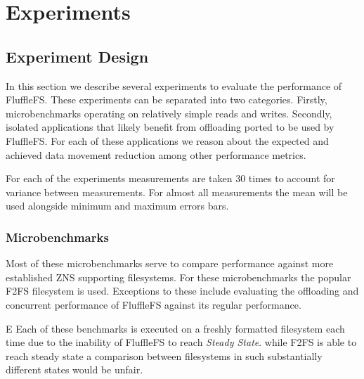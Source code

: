 
\chapter{Experiments} %



\ifpdf
    \graphicspath{{7/figures/PNG/}{7/figures/PDF/}{7/figures/}}
\else
    \graphicspath{{7/figures/EPS/}{7/figures/}}
\fi


% 

\section{Experiment Design}

In this section we describe several experiments to evaluate the performance of
FluffleFS. These experiments can be separated into two categories. Firstly,
microbenchmarks operating on relatively simple reads and writes.
Secondly, isolated applications that likely benefit from offloading
ported to be used by FluffleFS. For each of these applications we reason
about the expected and achieved data movement reduction among other performance
metrics.

For each of the experiments measurements are taken 30 times to account for
variance between measurements. For almost all measurements the mean will
be used alongside minimum and maximum errors bars.

\subsection{Microbenchmarks}

Most of these microbenchmarks serve to compare performance against more
established ZNS supporting filesystems. For these microbenchmarks the popular
F2FS\cite{Lee2015F2FSAN} filesystem is used. Exceptions to these include
evaluating the offloading and concurrent performance of FluffleFS against its
regular performance.

E
Each of these benchmarks is executed on a freshly formatted filesystem each
time due to the inability of FluffleFS to reach \textit{Steady State}. while
F2FS is able to reach steady state a comparison between filesystems in such
substantially different states would be unfair.

